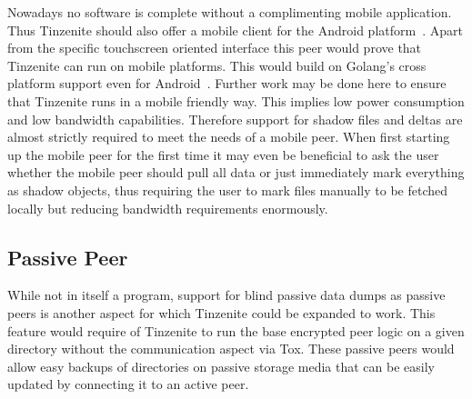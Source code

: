 Nowadays no software is complete without a complimenting mobile application.
Thus Tinzenite should also offer a mobile client for the Android platform~\cite{web:site:android}.
Apart from the specific touchscreen oriented interface this peer would prove that Tinzenite can run on mobile platforms.
This would build on Golang's cross platform support even for Android~\cite{web:site:golang:mobile}.
Further work may be done here to ensure that Tinzenite runs in a mobile friendly way.
This implies low power consumption and low bandwidth capabilities.
Therefore support for shadow files and deltas are almost strictly required to meet the needs of a mobile peer.
When first starting up the mobile peer for the first time it may even be beneficial to ask the user whether the mobile peer should pull all data or just immediately mark everything as shadow objects, thus requiring the user to mark files manually to be fetched locally but reducing bandwidth requirements enormously.

\subsection{Passive Peer}

While not in itself a program, support for blind passive data dumps as passive peers is another aspect for which Tinzenite could be expanded to work.
This feature would require of Tinzenite to run the base encrypted peer logic on a given directory without the communication aspect via Tox.
These passive peers would allow easy backups of directories on passive storage media that can be easily updated by connecting it to an active peer.

